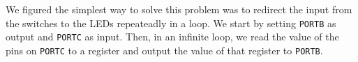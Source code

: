 We figured the simplest way to solve this problem was to redirect the input from the switches to the LEDs repeateadly in a loop. We start by setting \texttt{PORTB} as output and \texttt{PORTC} as input. Then, in an infinite loop, we read the value of the pins on \texttt{PORTC} to a register and output the value of that register to \texttt{PORTB}.
